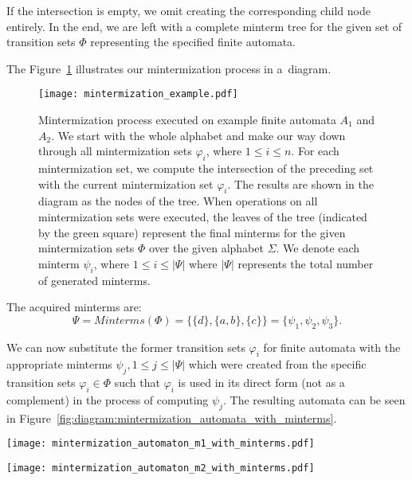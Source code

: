 If the intersection is empty, we omit creating the corresponding child node entirely. In the end, we are left with a complete minterm tree for the given set of transition sets $\Phi$ representing the specified finite automata.

The Figure~\ref{fig:diagram:mintermization_example} illustrates our mintermization process in a~diagram.

\begin{figure}[ht]
	\centering
	\texttt{[image: mintermization\_example.pdf]}
	\caption{Mintermization process executed on example finite automata $A_1$ and $A_2$. We start with the whole alphabet and make our way down through all mintermization sets $\varphi_i$, where $1 \leq i \leq n$. For each mintermization set, we compute the intersection of the preceding set with the current mintermization set $\varphi_i$. The results are shown in the diagram as the nodes of the tree. When operations on all mintermization sets were executed, the leaves of the tree (indicated by the green square) represent the final minterms for the given mintermization sets $\Phi$ over the given alphabet $\Sigma$. We denote each minterm $\psi_i$, where $1 \leq i \leq |\Psi|$ where $|\Psi|$ represents the total number of generated minterms.}
	\label{fig:diagram:mintermization_example}
\end{figure}

The acquired minterms are:
$$ \Psi = Minterms(\Phi) = \{ \{d\}, \{a, b\}, \{c\} \} = \{ \psi_1, \psi_2, \psi_3 \} \text{.}$$

We can now substitute the former transition sets $\varphi_i$ for finite automata with the appropriate minterms $\psi_j, 1 \leq j \leq |\Psi|$ which were created from the specific transition sets $\varphi_i \in \Phi$ such that $\varphi_i$ is used in its direct form (not as a complement) in the process of computing $\psi_j$. The resulting automata can be seen in Figure~\ref{fig:diagram:mintermization_automata_with_minterms}.

\begin{figure*}[ht]
    \centering
    \begin{minipage}{0.49\linewidth}
        \centering
        \texttt{[image: mintermization\_automaton\_m1\_with\_minterms.pdf]}
        \caption{Finite automaton $A_1$ with transitions substituted by corresponding minterms $\psi_i \in \Psi$ created from these transition sets.}
        \label{fig:diagram:mintermization_automaton_m1_with_minterms}
    \end{minipage}
    \hfill
    \begin{minipage}{0.49\linewidth}
        \centering
        \texttt{[image: mintermization\_automaton\_m2\_with\_minterms.pdf]}
        \caption{Finite automaton $A_2$ with transitions substituted by corresponding minterms $\psi_i \in \Psi$ created from these transition sets.}
        \label{fig:diagram:mintermization_automaton_m2_with_minterms}
    \end{minipage}
    \vspace{0.5cm}
    \caption{Finite automata $A_1$ and $A_2$ with substituted transitions with minterms in the process of mintermization.}
    \label{fig:diagram:mintermization_automata_with_minterms}
\end{figure*}


